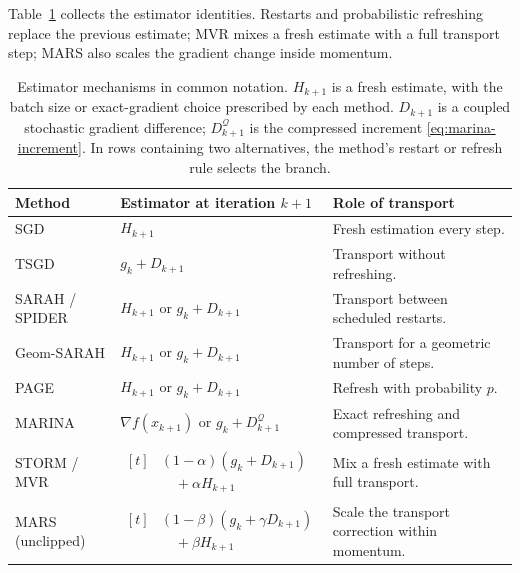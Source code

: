 Table~\ref{tab:transport-building-blocks} collects the estimator
identities. Restarts and probabilistic refreshing replace the previous
estimate; MVR mixes a fresh estimate with a full transport step; MARS
also scales the gradient change inside momentum.

\begin{table}[htbp]
\centering
\small
\setlength{\tabcolsep}{4pt}
\renewcommand{\arraystretch}{1.35}
\begin{tabular}{@{}>{\raggedright\arraybackslash}p{}
                  >{\raggedright\arraybackslash}p{}
                  >{\raggedright\arraybackslash}p{}@{}}
\toprule
Method & Estimator at iteration $k+1$ & Role of transport \\
\midrule
SGD
& $H_{k+1}$
& Fresh estimation every step. \\
TSGD
& $g_k+D_{k+1}$
& Transport without refreshing. \\
SARAH / SPIDER
& $H_{k+1}$ or $g_k+D_{k+1}$
& Transport between scheduled restarts. \\
Geom-SARAH
& $H_{k+1}$ or $g_k+D_{k+1}$
& Transport for a geometric number of steps. \\
PAGE
& $H_{k+1}$ or $g_k+D_{k+1}$
& Refresh with probability $p$. \\
MARINA
& $\nabla f(x_{k+1})$ or $g_k+D_{k+1}^{\mathcal Q}$
& Exact refreshing and compressed transport. \\
STORM / MVR
& $\begin{aligned}[t]
   &(1-\alpha)(g_k+D_{k+1})\\
   &\quad+\alpha H_{k+1}
   \end{aligned}$
& Mix a fresh estimate with full transport. \\
MARS (unclipped)
& $\begin{aligned}[t]
   &(1-\beta)(g_k+\gamma D_{k+1})\\
   &\quad+\beta H_{k+1}
   \end{aligned}$
& Scale the transport correction within momentum. \\
\bottomrule
\end{tabular}
\caption{Estimator mechanisms in common notation. $H_{k+1}$ is a
fresh estimate, with the batch size or exact-gradient choice prescribed
by each method. $D_{k+1}$ is a coupled stochastic gradient difference;
$D_{k+1}^{\mathcal Q}$ is the compressed increment
\eqref{eq:marina-increment}. In rows containing two alternatives, the
method's restart or refresh rule selects the branch.}
\label{tab:transport-building-blocks}
\end{table}

